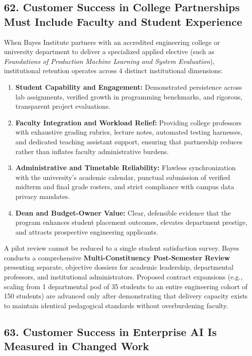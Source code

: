\subsection*{62. Customer Success in College Partnerships Must Include Faculty and Student Experience}

When Bayes Institute partners with an accredited engineering college or university department to deliver a specialized applied elective (such as \textit{Foundations of Production Machine Learning and System Evaluation}), institutional retention operates across 4 distinct institutional dimensions:

\begin{enumerate}[leftmargin=*]
\item \textbf{Student Capability and Engagement:} Demonstrated persistence across lab assignments, verified growth in programming benchmarks, and rigorous, transparent project evaluations.
\item \textbf{Faculty Integration and Workload Relief:} Providing college professors with exhaustive grading rubrics, lecture notes, automated testing harnesses, and dedicated teaching assistant support, ensuring that partnership reduces rather than inflates faculty administrative burdens.
\item \textbf{Administrative and Timetable Reliability:} Flawless synchronization with the university's academic calendar, punctual submission of verified midterm and final grade rosters, and strict compliance with campus data privacy mandates.
\item \textbf{Dean and Budget-Owner Value:} Clear, defensible evidence that the program enhances student placement outcomes, elevates department prestige, and attracts prospective engineering applicants.
\end{enumerate}

A pilot review cannot be reduced to a single student satisfaction survey. Bayes conducts a comprehensive \textbf{Multi-Constituency Post-Semester Review} presenting separate, objective dossiers for academic leadership, departmental professors, and institutional administrators. Proposed contract expansions (e.g., scaling from 1 departmental pod of 35 students to an entire engineering cohort of 150 students) are advanced only after demonstrating that delivery capacity exists to maintain identical pedagogical standards without overburdening faculty.

\subsection*{63. Customer Success in Enterprise AI Is Measured in Changed Work}

